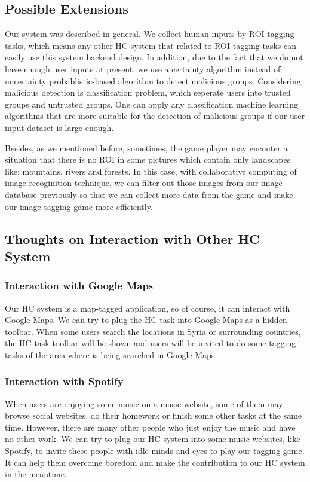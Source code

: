 \subsection{Possible Extensions}

Our system was described in general. We collect human inputs by ROI tagging tasks, 
which means any other HC system that related to ROI tagging tasks can easily use this system backend design.
In addition, due to the fact that we do not have enough user inputs at present, we use a certainty algorithm instead of 
uncertainty probablistic-based algorithm to detect malicious groups. 
Considering malicious detection is classification problem, which seperate users into trusted groups and untrusted groups. 
One can apply any classification machine learning algorithms that are more suitable for the detection of malicious groups 
if our user input dataset is large enough.

Besides, as we mentioned before, sometimes, the game player may encouter a situation that 
there is no ROI in some pictures which contain only landscapes like: mountains, rivers and forests.
In this case, with collaborative computing of image recoginition technique, we can filter out those images 
from our image database previously so that we can collect more data from the game and 
make our image tagging game more efficiently.

\subsection{Thoughts on Interaction with Other HC System}

\subsubsection{Interaction with Google Maps}
Our HC system is a map-tagged application, so of course, it can interact with Google Maps. We can try to plug the HC task into Google Maps as a hidden toolbar. When some users search the locations in Syria or surrounding countries, the HC task toolbar will be shown and users will be invited to do some tagging tasks of the area where is being searched in Google Maps.

\subsubsection{Interaction with Spotify}
When users are enjoying some music on a music website, some of them may browse social websites, do their homework or finish some other tasks at the same time. However, there are many other people who just enjoy the music and have no other work. We can try to plug our HC system into some music websites, like Spotify, to invite these people with idle minds and eyes to play our tagging game. It can help them overcome boredom and make the contribution to our HC system in the meantime.

